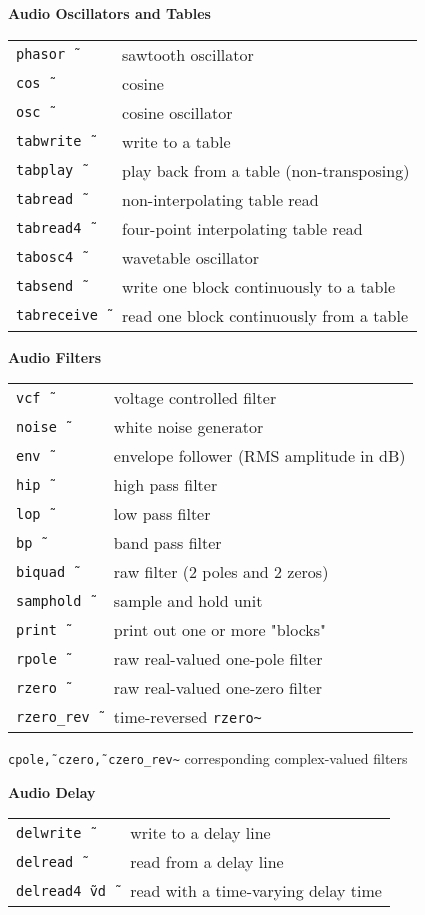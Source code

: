 \documentclass[a4paper, landscape, 10pt]{article}
\newcommand{\refcardtitle}[1]{
  \begin{center}
    \textbf{\small{#1}}
  \end{center}
}
\begin{document}
\begin{multicols}{3}
  \refcardtitle{Audio Oscillators and Tables}
  \begin{tabularx}{9cm}{>{\tt}l X}
    phasor\~\ & sawtooth oscillator \\
    cos\~\ & cosine \\
    osc\~\ & cosine oscillator \\
    tabwrite\~\ & write to a table \\
    tabplay\~\ & play back from a table (non-transposing) \\
    tabread\~\ & non-interpolating table read \\
    tabread4\~\ & four-point interpolating table read \\
    tabosc4\~\ & wavetable oscillator \\ 
    tabsend\~\ & write one block continuously to a table \\
    tabreceive\~\ & read one block continuously from a table \\
  \end{tabularx}
  
  \refcardtitle{Audio Filters}
  \begin{tabularx}{9cm}{>{\tt}l X}
    vcf\~\ & voltage controlled filter \\
    noise\~\ &  white noise generator \\
    env\~\ & envelope follower (RMS amplitude in dB) \\
    hip\~\ &  high pass filter \\
    lop\~\ &  low pass filter \\ 
    bp\~\ &  band pass filter \\
    biquad\~\ & raw filter (2 poles and 2 zeros)\\ 
    samphold\~\ & sample and hold unit \\
    print\~\ & print out one or more "blocks" \\
    rpole\~\ & raw real-valued one-pole filter \\
    rzero\~\ & raw real-valued one-zero filter \\
    rzero\_rev\~\ & time-reversed \texttt{rzero\~} \\
  \end{tabularx}
  \texttt{cpole\~, czero\~, czero\_rev\~} corresponding complex-valued filters

  \refcardtitle{Audio Delay}
  \begin{tabularx}{9cm}{>{\tt}l X}
    delwrite\~\ & write to a delay line \\
    delread\~\ & read from a delay line \\
    delread4\~\ vd\~\ & read with a time-varying delay time \\
  \end{tabularx}
  

\end{multicols}
\end{document}
